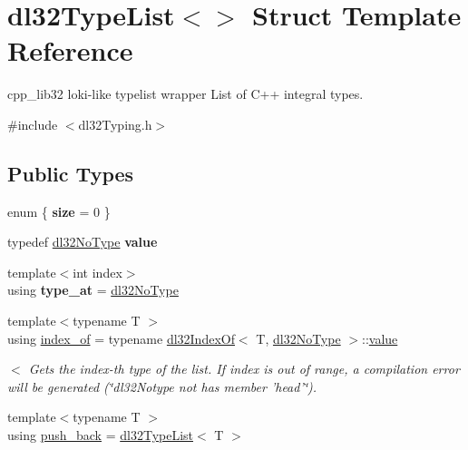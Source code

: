 \hypertarget{structdl32_type_list_3_4}{\section{dl32\-Type\-List$<$$>$ Struct Template Reference}
\label{structdl32_type_list_3_4}
}


cpp\-\_\-lib32 loki-\/like typelist wrapper List of C++ integral types.  




{\ttfamily \#include $<$dl32\-Typing.\-h$>$}

\subsection*{Public Types}
\begin{DoxyCompactItemize}
\item 
enum \{ {\bfseries size} = 0
 \}
\item 
\hypertarget{structdl32_type_list_3_4_a232a600573478a53e3c2d8f560e5f740}{typedef \hyperlink{classdl32_no_type}{dl32\-No\-Type} {\bfseries value}}\label{structdl32_type_list_3_4_a232a600573478a53e3c2d8f560e5f740}

\item 
\hypertarget{structdl32_type_list_3_4_a340eccdafb8151d764281ead3865f6b5}{{\footnotesize template$<$int index$>$ }\\using {\bfseries type\-\_\-at} = \hyperlink{classdl32_no_type}{dl32\-No\-Type}}\label{structdl32_type_list_3_4_a340eccdafb8151d764281ead3865f6b5}

\item 
\hypertarget{structdl32_type_list_3_4_a132a8dbff95fbae506702f5c64028d9f}{{\footnotesize template$<$typename T $>$ }\\using \hyperlink{structdl32_type_list_3_4_a132a8dbff95fbae506702f5c64028d9f}{index\-\_\-of} = typename \hyperlink{structdl32_index_of}{dl32\-Index\-Of}$<$ T, \hyperlink{classdl32_no_type}{dl32\-No\-Type} $>$\-::\hyperlink{classdl32_no_type}{value}}\label{structdl32_type_list_3_4_a132a8dbff95fbae506702f5c64028d9f}

\begin{DoxyCompactList}\small\item\em $<$ Gets the index-\/th type of the list. If index is out of range, a compilation error will be generated (\char`\"{}dl32\-Notype not has member 'head'\char`\"{}). \end{DoxyCompactList}\item 
\hypertarget{structdl32_type_list_3_4_a2380b4b6362e56cf4d0247d9d9517b91}{{\footnotesize template$<$typename T $>$ }\\using \hyperlink{structdl32_type_list_3_4_a2380b4b6362e56cf4d0247d9d9517b91}{push\-\_\-back} = \hyperlink{structdl32_type_list}{dl32\-Type\-List}$<$ T $>$}\label{structdl32_type_list_3_4_a2380b4b6362e56cf4d0247d9d9517b91}


\end{DoxyCompactItemize}
